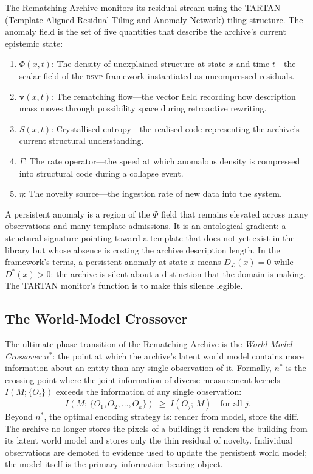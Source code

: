 \documentclass[12pt, letterpaper]{article}
\theoremstyle{remark}
\newcommand{\rsvp}{\textsc{rsvp}}
\begin{document}
The Rematching Archive monitors its residual stream using the TARTAN
(Template-Aligned Residual Tiling and Anomaly Network) tiling structure.
The anomaly field is the set of five quantities that describe the archive's
current epistemic state:
\begin{enumerate}
  \item $\Phi(x, t)$: The density of unexplained structure at state $x$
    and time $t$---the scalar field of the \rsvp{} framework instantiated
    as uncompressed residuals.
  \item $\mathbf{v}(x, t)$: The rematching flow---the vector field recording
    how description mass moves through possibility space during retroactive
    rewriting.
  \item $S(x, t)$: Crystallised entropy---the realised code representing
    the archive's current structural understanding.
  \item $\Gamma$: The rate operator---the speed at which anomalous density
    is compressed into structural code during a collapse event.
  \item $\eta$: The novelty source---the ingestion rate of new data into the
    system.
\end{enumerate}
A persistent anomaly is a region of the $\Phi$ field that remains elevated
across many observations and many template admissions.  It is an ontological
gradient: a structural signature pointing toward a template that does not
yet exist in the library but whose absence is costing the archive
description length.  In the framework's terms, a persistent anomaly at
state $x$ means $D_{\mathcal{L}}(x) = 0$ while $D^*(x) > 0$: the archive
is silent about a distinction that the domain is making.  The TARTAN
monitor's function is to make this silence legible.

\subsection{The World-Model Crossover}

The ultimate phase transition of the Rematching Archive is the
\emph{World-Model Crossover} $n^*$: the point at which the archive's
latent world model contains more information about an entity than any single
observation of it.  Formally, $n^*$ is the crossing point where the joint
information of diverse measurement kernels $I(M; \{O_i\})$ exceeds the
information of any single observation:
\begin{equation}
  I(M;\, \{O_1, O_2, \ldots, O_k\}) \;\geq\; I(O_j;\, M)
  \quad \text{for all } j.
\end{equation}
Beyond $n^*$, the optimal encoding strategy is: render from model, store
the diff.  The archive no longer stores the pixels of a building; it
renders the building from its latent world model and stores only the thin
residual of novelty.  Individual observations are demoted to evidence used
to update the persistent world model; the model itself is the primary
information-bearing object.
\end{document}
